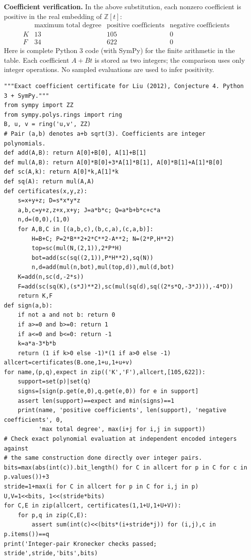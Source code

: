 \documentclass[11pt,a4paper]{article}
\numberwithin{equation}{section}
\theoremstyle{definition}
\theoremstyle{remark}
\begin{document}
\textbf{Coefficient verification.} In the above substitution, each nonzero
coefficient is positive in the real embedding of $\mathbb Z[t]$:
\[
\begin{array}{lrrr}
 &\text{maximum total degree}&\text{positive coefficients}&\text{negative coefficients}\\
 K&13&105&0\\ F&34&622&0
\end{array}
\]
Here is complete Python 3 code (with SymPy) for the finite arithmetic in the table.
Each coefficient $A+Bt$ is stored as two integers; the comparison uses only
integer operations. No sampled evaluations are used to infer positivity.

\begin{Verbatim}
"""Exact coefficient certificate for Liu (2012), Conjecture 4. Python 3 + SymPy."""
from sympy import ZZ
from sympy.polys.rings import ring
B, u, v = ring('u,v', ZZ)
# Pair (a,b) denotes a+b sqrt(3). Coefficients are integer polynomials.
def add(A,B): return A[0]+B[0], A[1]+B[1]
def mul(A,B): return A[0]*B[0]+3*A[1]*B[1], A[0]*B[1]+A[1]*B[0]
def sc(A,k): return A[0]*k,A[1]*k
def sq(A): return mul(A,A)
def certificates(x,y,z):
    s=x+y+z; D=s*x*y*z
    a,b,c=y+z,z+x,x+y; J=a*b*c; Q=a*b+b*c+c*a
    n,d=(0,0),(1,0)
    for A,B,C in [(a,b,c),(b,c,a),(c,a,b)]:
        H=B+C; P=2*B**2+2*C**2-A**2; N=(2*P,H**2)
        top=sc(mul(N,(2,1)),2*P*H)
        bot=add(sc(sq((2,1)),P*H**2),sq(N))
        n,d=add(mul(n,bot),mul(top,d)),mul(d,bot)
    K=add(n,sc(d,-2*s))
    F=add(sc(sq(K),(s*J)**2),sc(mul(sq(d),sq((2*s*Q,-3*J))),-4*D))
    return K,F
def sign(a,b):
    if not a and not b: return 0
    if a>=0 and b>=0: return 1
    if a<=0 and b<=0: return -1
    k=a*a-3*b*b
    return (1 if k>0 else -1)*(1 if a>0 else -1)
allcert=certificates(B.one,1+u,1+u+v)
for name,(p,q),expect in zip(('K','F'),allcert,[105,622]):
    support=set(p)|set(q)
    signs=[sign(p.get(e,0),q.get(e,0)) for e in support]
    assert len(support)==expect and min(signs)==1
    print(name, 'positive coefficients', len(support), 'negative coefficients', 0,
          'max total degree', max(i+j for i,j in support))
# Check exact polynomial evaluation at independent encoded integers against
# the same construction done directly over integer pairs.
bits=max(abs(int(c)).bit_length() for C in allcert for p in C for c in p.values())+3
stride=1+max(i for C in allcert for p in C for i,j in p)
U,V=1<<bits, 1<<(stride*bits)
for C,E in zip(allcert, certificates(1,1+U,1+U+V)):
    for p,q in zip(C,E):
        assert sum(int(c)<<(bits*(i+stride*j)) for (i,j),c in p.items())==q
print('Integer-pair Kronecker checks passed; stride',stride,'bits',bits)
\end{Verbatim}
\end{document}
